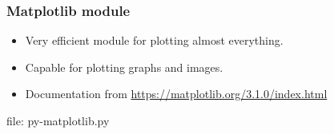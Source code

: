 \begin{frame}[fragile]
\frametitle{Matplotlib module}

\begin{itemize}
\item Very efficient module for plotting almost everything.
\item Capable for plotting graphs and images.
\item Documentation from \url{https://matplotlib.org/3.1.0/index.html}
\end{itemize}

\newcommand{\newfilename}{py-matplotlib.py}



file: \newfilename

\end{frame}